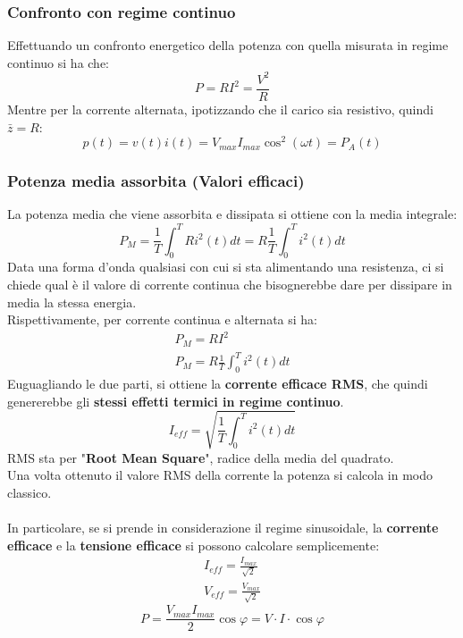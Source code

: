 \documentclass[../main.tex]{subfiles}
\begin{document}
	\subsubsection{Confronto con regime continuo}
	Effettuando un confronto energetico della potenza con quella misurata in regime continuo si ha che:
	\begin{equation}
		P=RI^2=\frac{V^2}{R}	
	\end{equation}
	Mentre per la corrente alternata, ipotizzando che il carico sia resistivo, quindi $\bar z = R$:
	\begin{equation}
		p(t)=v(t)i(t)=V_{max}I_{max}\cos^2(\omega t) = P_A(t)	
	\end{equation}
	\subsubsection{Potenza media assorbita (Valori efficaci)}
	La potenza media che viene assorbita e dissipata si ottiene con la media integrale:
	\begin{equation}
		P_M=\frac{1}{T}\int_0^T Ri^2(t)dt=R\frac{1}{T}\int_0^T i^2(t)dt	
	\end{equation}
	Data una forma d'onda qualsiasi con cui si sta alimentando una resistenza, ci si chiede qual è il valore di corrente continua che bisognerebbe dare per dissipare in media la stessa energia. \\
	Rispettivamente, per corrente continua e alternata si ha:
	\begin{gather}
		P_M=RI^2 \\
		P_M=R\frac{1}{T}\int_0^T i^2(t)dt
	\end{gather}
	Euguagliando le due parti, si ottiene la \textbf{corrente efficace RMS}, che quindi genererebbe gli \textbf{stessi effetti termici in regime continuo}.
	\begin{equation}
		I_{eff}=\sqrt{\frac{1}{T}\int_0^T i^2(t)dt}	
	\end{equation}
	RMS sta per "\textbf{Root Mean Square}", radice della media del quadrato. \\
	Una volta ottenuto il valore RMS della corrente la potenza si calcola in modo classico.\\\\
	In particolare, se si prende in considerazione il regime sinusoidale, la \textbf{corrente efficace} e la \textbf{tensione efficace} si possono calcolare semplicemente:
	\begin{gather}
		I_{eff}=\frac{I_{max}}{\sqrt{2}} \\
		V_{eff}=\frac{V_{max}}{\sqrt{2}}
	\end{gather}
	\begin{equation}
		P=\frac{V_{max}I_{max}}{2}\cos \varphi = V\cdot I \cdot \cos \varphi	
	\end{equation}
\end{document}
